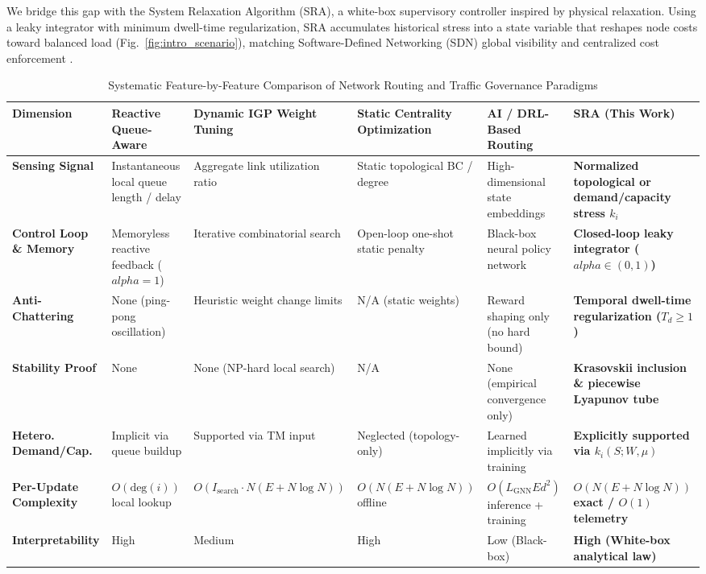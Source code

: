\documentclass{ccjnl}
\newcommand{\rev}[1]{{\color{blue}#1}}
\def\rev#1{#1}%
\def\widetilde#1{#1}%
\def\kappa{k}%
\def\alpha{alpha}%
\begin{document}
We bridge this gap with the System Relaxation Algorithm (SRA), a white-box supervisory controller inspired by physical relaxation. Using a leaky integrator \rev{with minimum dwell-time regularization}, SRA accumulates historical stress into a state variable that reshapes node costs toward balanced load (Fig.~\ref{fig:intro_scenario}), matching Software-Defined Networking (SDN) global visibility and centralized cost enforcement \cite{hou2020reliable}.

\begin{table}[t]
\centering
\scriptsize\setlength{\tabcolsep}{3.5pt}\renewcommand{\arraystretch}{1.05}
\caption{\rev{Systematic Feature-by-Feature Comparison of Network Routing and Traffic Governance Paradigms}}
\label{tab:related_work_comparison}
\begin{tabularx}{\textwidth}{@{}l*{5}{>{\raggedright\arraybackslash}X}@{}}
\toprule
\textbf{Dimension} & \textbf{Reactive Queue-Aware \cite{Macabale2020Cradle,SM2025Novel}} & \textbf{Dynamic IGP Weight Tuning \cite{Fortz2000OSPF}} & \textbf{Static Centrality Optimization \cite{Upadhyay2024OpticalBC,DeMedeiros2017QuasiShortest}} & \textbf{AI / DRL-Based Routing \cite{Wei2023GRLPS,Feng2025MultiAgentGNN}} & \textbf{SRA (This Work)} \\
\midrule
\textbf{Sensing Signal} & Instantaneous local queue length / delay & Aggregate link utilization ratio & Static topological BC / degree & High-dimensional state embeddings & \rev{\textbf{Normalized topological or demand/capacity stress $\widetilde{\kappa}_i$}} \\
\textbf{Control Loop \& Memory} & Memoryless reactive feedback ($\alpha=1$) & Iterative combinatorial search & Open-loop one-shot static penalty & Black-box neural policy network & \rev{\textbf{Closed-loop leaky integrator ($\alpha \in (0,1)$)}} \\
\textbf{Anti-Chattering} & None (ping-pong oscillation) & Heuristic weight change limits & N/A (static weights) & Reward shaping only (no hard bound) & \rev{\textbf{Temporal dwell-time regularization ($T_d \ge 1$)}} \\
\textbf{Stability Proof} & None & None (NP-hard local search) & N/A & None (empirical convergence only) & \rev{\textbf{Krasovskii inclusion \& piecewise Lyapunov tube}} \\
\textbf{Hetero. Demand/Cap.} & Implicit via queue buildup & Supported via TM input & Neglected (topology-only) & Learned implicitly via training & \rev{\textbf{Explicitly supported via $\widetilde{\kappa}_i(S;W,\mu)$}} \\
\textbf{Per-Update Complexity} & $O(\text{deg}(i))$ local lookup & $O(I_{\text{search}}\cdot N(E+N\log N))$ & $O(N(E+N\log N))$ offline & $O(L_{\text{GNN}} E d^2)$ inference + training & \rev{\textbf{$O(N(E+N\log N))$ exact / $O(1)$ telemetry}} \\
\textbf{Interpretability} & High & Medium & High & Low (Black-box) & \textbf{High (White-box analytical law)} \\
\bottomrule
\end{tabularx}
\end{table}
\end{document}
